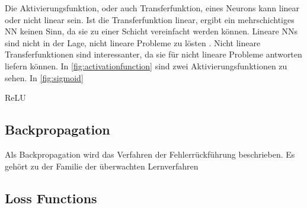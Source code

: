 Die Aktivierungsfunktion, oder auch Transferfunktion, eines Neurons kann linear oder nicht linear sein. Ist die Transferfunktion linear, ergibt ein mehrschichtiges \ac{NN} keinen Sinn, da sie zu einer Schicht vereinfacht werden können. Lineare \acp{NN} sind nicht in der Lage, nicht lineare Probleme zu lösten \cite{minsky1969perceptron}. Nicht lineare Transferfunktionen sind interessanter, da sie für nicht lineare Probleme antworten liefern können. In \autoref{fig:activationfunction} sind zwei Aktivierungsfunktionen zu sehen. In \autoref{fig:sigmoid}

\ac{ReLU}

\subsection{Backpropagation}
Als Backpropagation wird das Verfahren der Fehlerrückführung beschrieben. Es gehört zu der Familie der überwachten Lernverfahren





\subsection{Loss Functions}


